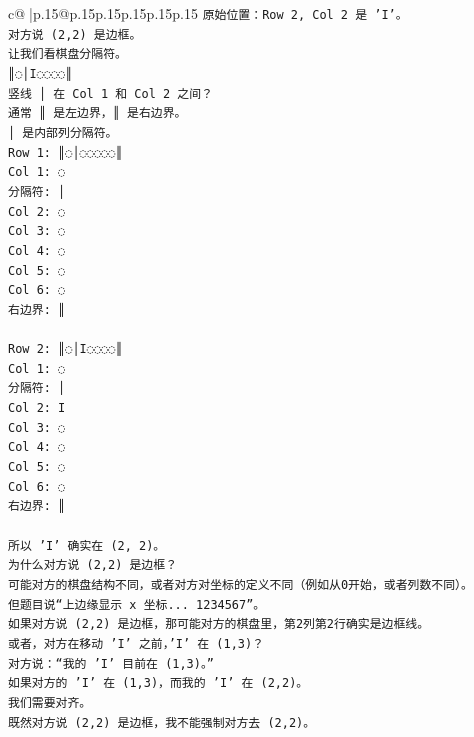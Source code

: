 \documentclass{article}
\begin{document}
{\begin{supertabular}{c@{$\;$}|p{.15\linewidth}@{}p{.15\linewidth}p{.15\linewidth}p{.15\linewidth}p{.15\linewidth}p{.15\linewidth}}
{{{\texttt{原始位置：Row 2, Col 2 是 'I'。} \\
\texttt{对方说 (2,2) 是边框。} \\
\texttt{让我们看棋盘分隔符。} \\
\texttt{║◌│I◌◌◌◌║} \\
\texttt{竖线 │ 在 Col 1 和 Col 2 之间？} \\
\texttt{通常 ║ 是左边界，║ 是右边界。} \\
\texttt{│ 是内部列分隔符。} \\
\texttt{Row 1: ║◌│◌◌◌◌◌║} \\
\texttt{Col 1: ◌} \\
\texttt{分隔符: │} \\
\texttt{Col 2: ◌} \\
\texttt{Col 3: ◌} \\
\texttt{Col 4: ◌} \\
\texttt{Col 5: ◌} \\
\texttt{Col 6: ◌} \\
\texttt{右边界: ║} \\
\\ 
\texttt{Row 2: ║◌│I◌◌◌◌║} \\
\texttt{Col 1: ◌} \\
\texttt{分隔符: │} \\
\texttt{Col 2: I} \\
\texttt{Col 3: ◌} \\
\texttt{Col 4: ◌} \\
\texttt{Col 5: ◌} \\
\texttt{Col 6: ◌} \\
\texttt{右边界: ║} \\
\\ 
\texttt{所以 'I' 确实在 (2, 2)。} \\
\texttt{为什么对方说 (2,2) 是边框？} \\
\texttt{可能对方的棋盘结构不同，或者对方对坐标的定义不同（例如从0开始，或者列数不同）。} \\
\texttt{但题目说“上边缘显示 x 坐标... 1234567”。} \\
\texttt{如果对方说 (2,2) 是边框，那可能对方的棋盘里，第2列第2行确实是边框线。} \\
\texttt{或者，对方在移动 'I' 之前，'I' 在 (1,3)？} \\
\texttt{对方说：“我的 'I' 目前在 (1,3)。”} \\
\texttt{如果对方的 'I' 在 (1,3)，而我的 'I' 在 (2,2)。} \\
\texttt{我们需要对齐。} \\
\texttt{既然对方说 (2,2) 是边框，我不能强制对方去 (2,2)。} \\
}}}
\end{supertabular}}
\end{document}
